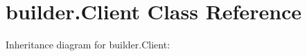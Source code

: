 \hypertarget{classbuilder_1_1Client}{}\section{builder.\+Client Class Reference}
\label{classbuilder_1_1Client}


Inheritance diagram for builder.\+Client\+:
